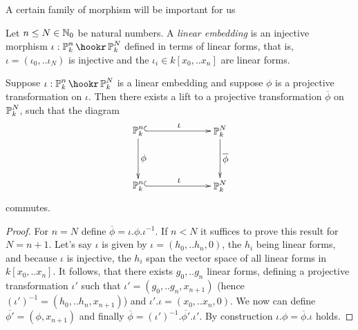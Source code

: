 A certain family of morphism will be important for us
\begin{definition}
Let $n \leq N \in \operatorname{\mathbb N_0}$ be natural numbers.
A \emph{linear embedding} is an injective morphism $\iota : \proj^n_k \hookr \proj^N_k$ defined in terms of linear forms, that is, $\iota = (\iota_0,..\iota_N)$ is injective and the $\iota_i \in k[x_0,..x_n]$ are linear forms.
\end{definition}

\begin{proposition} \label{propositionLiftingAutomorphisms}
Suppose $\iota : \proj^n_k \hookr \proj^N_k$ is a linear embedding and suppose $\phi$ is a projective transformation on $\iota$.
Then there exists a lift to a projective transformation $\overline\phi$ on $\operatorname{\mathbb P}^N_k$, such that the diagram
\begin{equation}
\begin{xy}
(0,20)*+{\proj^n_k}="n";
(30,20)*+{\proj^N_k}="N";
(0,0)*+{\proj^n_k}="n1";
(30,0)*+{\proj^N_k}="N1";
{\ar@{^{(}->} "n";"N"}?*!/_2mm/{\iota};
{\ar@{^{(}->} "n1";"N1"}?*!/_2mm/{\iota};
{\ar@{->} "n";"n1"}?*!/_2mm/{\phi};
{\ar@{->} "N";"N1"}?*!/_2mm/{\overline{\phi}};
\end{xy}
\end{equation}
commutes.
\end{proposition}
\begin{proof}
For $n=N$ define $\overline\phi = \iota.\phi.\iota^{-1}$.
If $n < N$ it suffices to prove this result for $N = n+1$.
Let's say $\iota$ is given by $\iota = (h_0,..h_n,0)$, the $h_i$ being linear forms, and because $\iota$ is injective, the $h_i$ span the vector space of all linear forms in $k[x_0,..x_n]$.
It follows, that there exists $g_0,..g_n$ linear forms, defining a projective transformation $\iota'$ such that $\iota' = (g_0,..g_n,x_{n+1})$ (hence $(\iota')^{-1} = (h_0,..h_n,x_{n+1})$) and $\iota'.\iota = (x_0,..x_n,0)$.
We now can define $\overline{\phi'} = (\phi,x_{n+1})$ and finally $\overline\phi = (\iota')^{-1}.\overline{\phi'}.\iota'$.
By construction $\iota.\phi = \overline\phi . \iota$ holds.
\end{proof}



